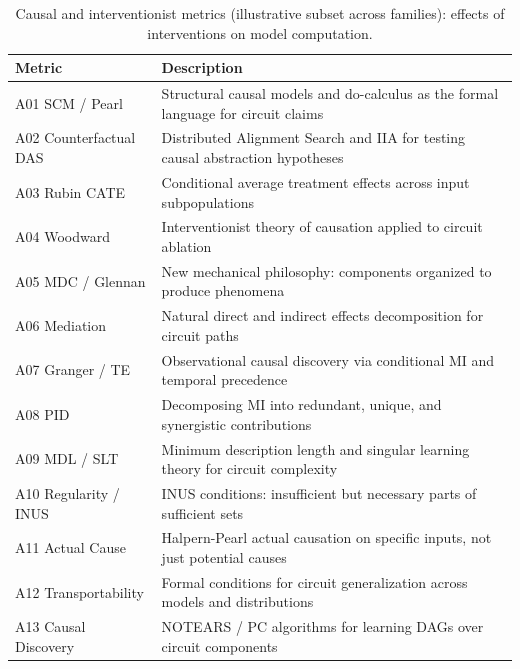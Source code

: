 \documentclass{article}
\begin{document}
\begin{table}[H]
\centering
\small
\caption{Causal and interventionist metrics (illustrative subset across families): effects of interventions on model computation.}
\label{tab:causal_metrics}
\renewcommand{\arraystretch}{1.15}
\begin{tabular}{@{}l>{\raggedright\arraybackslash}p{9.5cm}@{}}
\toprule
\textbf{Metric} & \textbf{Description} \\
\midrule
A01 SCM / Pearl & Structural causal models and do-calculus as the formal language for circuit claims \\
\midrule
A02 Counterfactual DAS & Distributed Alignment Search and IIA for testing causal abstraction hypotheses \\
\midrule
A03 Rubin CATE & Conditional average treatment effects across input subpopulations \\
\midrule
A04 Woodward & Interventionist theory of causation applied to circuit ablation \\
\midrule
A05 MDC / Glennan & New mechanical philosophy: components organized to produce phenomena \\
\midrule
A06 Mediation & Natural direct and indirect effects decomposition for circuit paths \\
\midrule
A07 Granger / TE & Observational causal discovery via conditional MI and temporal precedence \\
\midrule
A08 PID & Decomposing MI into redundant, unique, and synergistic contributions \\
\midrule
A09 MDL / SLT & Minimum description length and singular learning theory for circuit complexity \\
\midrule
A10 Regularity / INUS & INUS conditions: insufficient but necessary parts of sufficient sets \\
\midrule
A11 Actual Cause & Halpern-Pearl actual causation on specific inputs, not just potential causes \\
\midrule
A12 Transportability & Formal conditions for circuit generalization across models and distributions \\
\midrule
A13 Causal Discovery & NOTEARS / PC algorithms for learning DAGs over circuit components \\
\bottomrule
\end{tabular}
\end{table}
\end{document}
